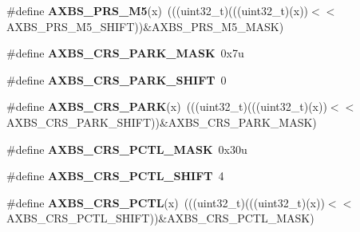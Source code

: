 \begin{DoxyCompactItemize}
\item 
\#define {\bfseries A\+X\+B\+S\+\_\+\+P\+R\+S\+\_\+\+M5}(x)~(((uint32\+\_\+t)(((uint32\+\_\+t)(x))$<$$<$A\+X\+B\+S\+\_\+\+P\+R\+S\+\_\+\+M5\+\_\+\+S\+H\+I\+FT))\&A\+X\+B\+S\+\_\+\+P\+R\+S\+\_\+\+M5\+\_\+\+M\+A\+SK)\hypertarget{group__AXBS__Register__Masks_ga870ade9ac3018fe211f9574ca81b987a}{}\label{group__AXBS__Register__Masks_ga870ade9ac3018fe211f9574ca81b987a}

\item 
\#define {\bfseries A\+X\+B\+S\+\_\+\+C\+R\+S\+\_\+\+P\+A\+R\+K\+\_\+\+M\+A\+SK}~0x7u\hypertarget{group__AXBS__Register__Masks_gadfcbad36cb3a462a0ddbb4fd7ec4dc6d}{}\label{group__AXBS__Register__Masks_gadfcbad36cb3a462a0ddbb4fd7ec4dc6d}

\item 
\#define {\bfseries A\+X\+B\+S\+\_\+\+C\+R\+S\+\_\+\+P\+A\+R\+K\+\_\+\+S\+H\+I\+FT}~0\hypertarget{group__AXBS__Register__Masks_ga3beb82412a3e9fbd7712210fcb073d73}{}\label{group__AXBS__Register__Masks_ga3beb82412a3e9fbd7712210fcb073d73}

\item 
\#define {\bfseries A\+X\+B\+S\+\_\+\+C\+R\+S\+\_\+\+P\+A\+RK}(x)~(((uint32\+\_\+t)(((uint32\+\_\+t)(x))$<$$<$A\+X\+B\+S\+\_\+\+C\+R\+S\+\_\+\+P\+A\+R\+K\+\_\+\+S\+H\+I\+FT))\&A\+X\+B\+S\+\_\+\+C\+R\+S\+\_\+\+P\+A\+R\+K\+\_\+\+M\+A\+SK)\hypertarget{group__AXBS__Register__Masks_ga50b3beac990e12ab15d0dbe05235bcee}{}\label{group__AXBS__Register__Masks_ga50b3beac990e12ab15d0dbe05235bcee}

\item 
\#define {\bfseries A\+X\+B\+S\+\_\+\+C\+R\+S\+\_\+\+P\+C\+T\+L\+\_\+\+M\+A\+SK}~0x30u\hypertarget{group__AXBS__Register__Masks_gae9582bf93b9b0b8fa349ebb7e61ca312}{}\label{group__AXBS__Register__Masks_gae9582bf93b9b0b8fa349ebb7e61ca312}

\item 
\#define {\bfseries A\+X\+B\+S\+\_\+\+C\+R\+S\+\_\+\+P\+C\+T\+L\+\_\+\+S\+H\+I\+FT}~4\hypertarget{group__AXBS__Register__Masks_ga010aca7f5f083633f9a2e1eb1e9e02e3}{}\label{group__AXBS__Register__Masks_ga010aca7f5f083633f9a2e1eb1e9e02e3}

\item 
\#define {\bfseries A\+X\+B\+S\+\_\+\+C\+R\+S\+\_\+\+P\+C\+TL}(x)~(((uint32\+\_\+t)(((uint32\+\_\+t)(x))$<$$<$A\+X\+B\+S\+\_\+\+C\+R\+S\+\_\+\+P\+C\+T\+L\+\_\+\+S\+H\+I\+FT))\&A\+X\+B\+S\+\_\+\+C\+R\+S\+\_\+\+P\+C\+T\+L\+\_\+\+M\+A\+SK)\hypertarget{group__AXBS__Register__Masks_gaf04c792a7641bdc9a55f66391e78809e}{}\label{group__AXBS__Register__Masks_gaf04c792a7641bdc9a55f66391e78809e}


\end{DoxyCompactItemize}
